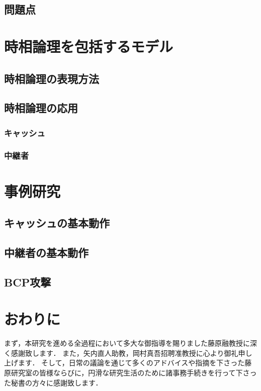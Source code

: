 \documentclass[12pt,a4paper]{jbook}
\begin{document}
\section{問題点}

\chapter{時相論理を包括するモデル}
\section{時相論理の表現方法}
\section{時相論理の応用}
\subsection{キャッシュ}
\subsection{中継者}

\chapter{事例研究}
\section{キャッシュの基本動作}
\section{中継者の基本動作}
\section{BCP攻撃}

\chapter{おわりに}

\acknowledgement
まず，本研究を進める全過程において多大な御指導を賜りました藤原融教授に深く感謝致します．
また，矢内直人助教，岡村真吾招聘准教授に心より御礼申し上げます．
そして，日常の議論を通じて多くのアドバイスや指摘を下さった藤原研究室の皆様ならびに，円滑な研究生活のために諸事務手続きを行って下さった秘書の方々に感謝致します．


 
\end{document}
